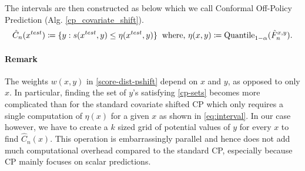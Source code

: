 The intervals are then constructed as below which we call Conformal Off-Policy Prediction (Alg. \ref{cp_covariate_shift}).
\begin{align}
    \hat{C}_n(x^{test}) \coloneqq \{y: s(x^{test},y) \leq \eta(x^{test}, y)\} \hspace{0.2cm} \textup{where, }  \eta(x, y) \coloneqq \text{Quantile}_{1-\alpha}( \hat{F}_{n}^{x, y}). \label{cp-sets}
\end{align}

\paragraph{Remark}
    The weights $w(x, y)$ in \eqref{score-dist-pshift} depend on $x$ and $y$, as opposed to only $x$. In particular, finding the set of $y$'s satisfying \eqref{cp-sets} becomes more complicated than for the standard covariate shifted CP which only requires a single computation of $\eta(x)$ for a given $x$ as shown in \eqref{eq:interval}. In our case however, we have to create a $k$ sized grid of potential values of $y$ for every $x$ to find $\hat{C}_n(x)$. This operation is embarrassingly parallel and hence does not add much computational overhead compared to the standard CP, especially because CP mainly focuses on scalar predictions.


